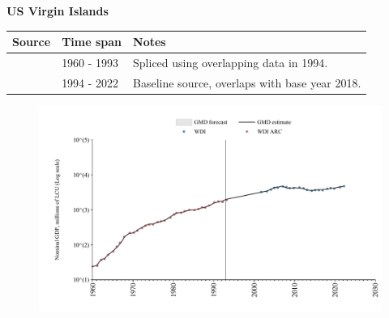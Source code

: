 \documentclass[12pt,a4paper,landscape]{article}
\begin{document}
\begin{adjustbox}{max totalsize={\paperwidth}{\paperheight},center}
\begin{minipage}[t][\textheight][t]{\textwidth}
\vspace*{0.5cm}
{}
\begin{center}
{\Large\bfseries US Virgin Islands}
\end{center}
\vspace{0.5cm}
\begin{table}[H]
\centering
\small
\begin{tabular}{|l|l|l|}
\hline
\textbf{Source} & \textbf{Time span} & \textbf{Notes} \\
\hline
\rowcolor{white}\cite{WDI_ARC}& 1960 - 1993 &Spliced using overlapping data in 1994.\\
\rowcolor{lightgray}\cite{WDI}& 1994 - 2022 &Baseline source, overlaps with base year 2018.\\
\hline
\end{tabular}
\end{table}
\begin{figure}[H]
\centering
\includegraphics[width=\textwidth,height=0.6\textheight,keepaspectratio]{graphs/VIR_nGDP.pdf}
\end{figure}
\end{minipage}
\end{adjustbox}
\end{document}
